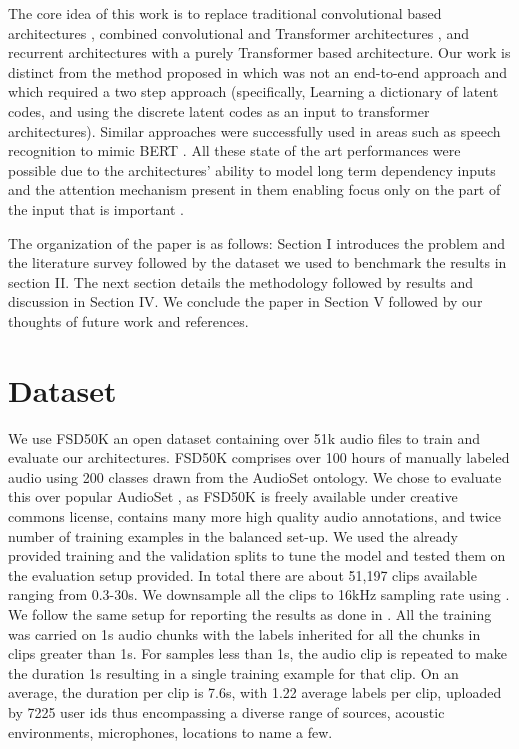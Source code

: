 \documentclass{article}
\begin{document}
\begin{sloppy}
The core idea of this work is to replace traditional convolutional based architectures \cite{gemmeke2017audio}, combined convolutional and Transformer architectures \cite{baevski2020wav2vec, baevski2019vq}, and recurrent architectures \cite{haque2018conditional,haque2019audio} with a purely Transformer based architecture. Our work is distinct from the method proposed in \cite{verma2020framework} which was not an end-to-end approach and which required a two step approach (specifically, Learning a dictionary of latent codes, and using the discrete latent codes as an input to transformer architectures). Similar approaches were successfully used in areas such as speech recognition \cite{baevski2020wav2vec} to mimic BERT \cite{devlin2018bert}. All these state of the art performances were possible due to the architectures' ability to model long term dependency inputs and the attention mechanism  present in them enabling focus only on the part of the input that is important \cite{vaswani2017attention}. 

The organization of the paper is as follows: Section I introduces the problem and the literature survey followed by the dataset we used to benchmark the results in section II. The next section details the methodology followed by results and discussion in Section IV. We conclude the paper in Section V followed by our thoughts of future work and references.

\section{Dataset}
\label{sec:dataset}

We use FSD50K \cite{fonseca2020fsd50k} an open dataset containing over 51k audio files to train and evaluate our architectures. FSD50K comprises over 100 hours of manually labeled audio using 200 classes drawn from the AudioSet ontology. We chose to evaluate this over popular AudioSet \cite{gemmeke2017audio}, as FSD50K is freely available under creative commons license, contains many more high quality audio annotations, and twice number of training examples in the balanced set-up. We used the already provided training and the validation splits to tune the model and tested them on the evaluation setup provided. In total there are about 51,197 clips available ranging from 0.3-30s. We downsample all the clips to 16kHz sampling rate using \cite{virtanen2020scipy}. We follow the same setup for reporting the results as done in \cite{fonseca2020fsd50k}. All the training was carried on 1s audio chunks with the labels inherited for all the chunks in clips greater than 1s. For samples less than 1s, the audio clip is repeated to make the duration 1s resulting in a single training example for that clip. On an average, the duration per clip is 7.6s, with 1.22 average labels per clip, uploaded by 7225 user ids thus encompassing a diverse range of sources, acoustic environments, microphones, locations to name a few. 


\end{sloppy}
\end{document}
